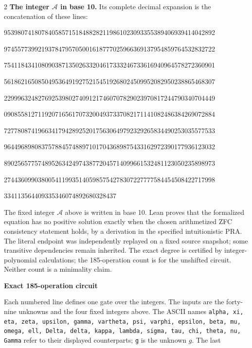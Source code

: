 \documentclass[10pt]{article}
\begin{document}
\begin{multicols}{2}
\textbf{The integer $\mathcal A$ in base 10.}
Its complete decimal expansion is the concatenation of these lines:\par
\begingroup\fontsize{7.7}{8.2}\selectfont{}\par
95398074180784058571518488282119861023093355389406939414042892\par
97455773992193784795705001618777025966369137954859764532832722\par
75411843410809038713502633204617333246733616940964578272360901\par
56186216508504953649192752154519268024509952082950238865468307\par
22999632482769253980274091217460707829023970817244790340704449\par
09085581271192071656170732004937337082171141082486384269072884\par
72778087419663417942892520175630649792329265834490253035577533\par
96449689808375788457488971017043689875433162972390177936123032\par
89025657757489526342497438772045714099661532481123050235898973\par
27443609903800541199351405985754278307227777584454508422717998\par
334113564409335346074892680328437\par
\endgroup
\normalfont\fontsize{7.7}{8.2}\selectfont
The fixed integer $\mathcal A$ above is written in base 10. Lean proves that the formalized equation has no positive solution exactly
when the chosen arithmetized ZFC consistency statement holds, by a derivation
in the specified intuitionistic PRA. The literal endpoint was independently
replayed on a fixed source snapshot; some transitive dependencies remain
inherited. The exact degree is certified by integer-polynomial calculations;
the 185-operation count is for the unshifted circuit. Neither count is a
minimality claim.
\end{multicols}
\clearpage
\begin{center}{\large\bfseries Exact 185-operation circuit}\end{center}
Each numbered line defines one gate over the integers. The inputs are the
forty-nine unknowns and the four fixed integers above. The ASCII names
\texttt{alpha, xi, eta, zeta, upsilon, gamma, vartheta, psi, varphi, epsilon, beta, mu, omega, ell, Delta, delta, kappa, lambda, sigma, tau, chi, theta, nu, Gamma}
refer to their displayed counterparts; \texttt{g} is the unknown $g$. The last
\end{document}
